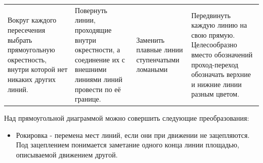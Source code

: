 \begin{tabular}{
>{\centering\arraybackslash}m{3cm}
>{\centering\arraybackslash}m{3cm}
>{\centering\arraybackslash}m{3cm}
>{\centering\arraybackslash}m{3cm}
}
\\
Вокруг каждого пересечения выбрать прямоугольную окрестность, внутри которой нет никаких других линий.
&
Повернуть линии, проходящие внутри окрестности, а соединение их с внешними линиями линий провести по её границе.
&
Заменить плавные линии ступенчатыми ломаными
&
Передвинуть каждую линию на свою прямую.
Целесообразно вместо обозначений проход-переход обозначать верхние и нижние линии разным цветом.
\end{tabular}


Над прямоугольной диаграммой можно совершить следующие преобразования:
\begin{itemize}
\item Рокировка - перемена мест линий, если они при движении не зацепляются. Под зацеплением понимается заметание одного конца линии площадью, описываемой движением другой.


\end{itemize}

